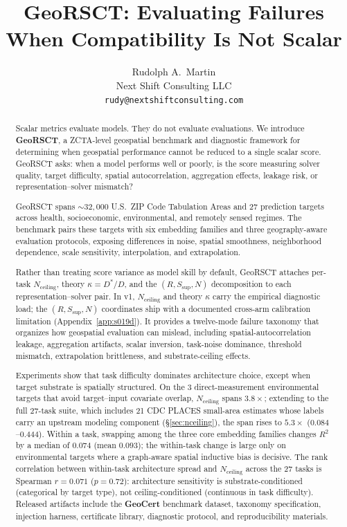 \documentclass{article}
\title{GeoRSCT: Evaluating Failures When Compatibility Is Not Scalar}
\author{%
  Rudolph A.\ Martin \\
  Next Shift Consulting LLC \\
  \texttt{rudy@nextshiftconsulting.com}
}
\begin{document}
\maketitle

\begin{abstract}
Scalar metrics evaluate models. They do not evaluate evaluations. We introduce \textbf{GeoRSCT}, a ZCTA-level geospatial benchmark and diagnostic framework for determining when geospatial performance cannot be reduced to a single scalar score. GeoRSCT asks: when a model performs well or poorly, is the score measuring solver quality, target difficulty, spatial autocorrelation, aggregation effects, leakage risk, or representation--solver mismatch?

GeoRSCT spans ${\sim}32{,}000$ U.S.\ ZIP Code Tabulation Areas and 27 prediction targets across health, socioeconomic, environmental, and remotely sensed regimes. The benchmark pairs these targets with six embedding families and three geography-aware evaluation protocols, exposing differences in noise, spatial smoothness, neighborhood dependence, scale sensitivity, interpolation, and extrapolation.

Rather than treating score variance as model skill by default, GeoRSCT attaches per-task $N_{\text{ceiling}}$, theory $\kappa = D^*/D$, and the $(R, S_{\text{sup}}, N)$ decomposition to each representation--solver pair. In v1, $N_{\text{ceiling}}$ and theory $\kappa$ carry the empirical diagnostic load; the $(R, S_{\text{sup}}, N)$ coordinates ship with a documented cross-arm calibration limitation (Appendix~\ref{app:s019d}). It provides a twelve-mode failure taxonomy that organizes how geospatial evaluation can mislead, including spatial-autocorrelation leakage, aggregation artifacts, scalar inversion, task-noise dominance, threshold mismatch, extrapolation brittleness, and substrate-ceiling effects.

Experiments show that task difficulty dominates architecture choice, except when target substrate is spatially structured. On the 3 direct-measurement environmental targets that avoid target--input covariate overlap, $N_{\text{ceiling}}$ spans $3.8{\times}$; extending to the full 27-task suite, which includes 21 CDC PLACES small-area estimates whose labels carry an upstream modeling component (\S\ref{sec:nceiling}), the span rises to $5.3{\times}$ ($0.084$--$0.444$). Within a task, swapping among the three core embedding families changes $R^2$ by a median of $0.074$ (mean $0.093$); the within-task change is large only on environmental targets where a graph-aware spatial inductive bias is decisive. The rank correlation between within-task architecture spread and $N_{\text{ceiling}}$ across the 27 tasks is Spearman $r = 0.071$ ($p = 0.72$): architecture sensitivity is substrate-conditioned (categorical by target type), not ceiling-conditioned (continuous in task difficulty). Released artifacts include the \textbf{GeoCert} benchmark dataset, taxonomy specification, injection harness, certificate library, diagnostic protocol, and reproducibility materials.
\end{abstract}
\end{document}
